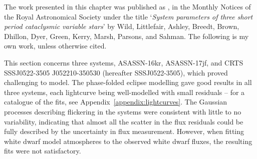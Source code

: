 \label{chpt:results:three peculiar white dwarfs} %


The work presented in this chapter was published as \cite{wild2021}, in the Monthly Notices of the Royal Astronomical Society under the title `\textit{System parameters of three short period cataclysmic variable stars}' by Wild, Littlefair, Ashley, Breedt, Brown, Dhillon, Dyer, Green, Kerry, Marsh, Parsons, and Sahman.
The following is my own work, unless otherwise cited.

This section concerns three systems, ASASSN-16kr, ASASSN-17jf, and CRTS SSSJ0522-3505 J052210-350530 (hereafter SSSJ0522-3505), which proved challenging to model.
The phase-folded eclipse modelling gave good results in all three systems, each lightcurve being well-modelled with small residuals -- for a catalogue of the fits, see Appendix~\ref{appendix:lightcurves}.
The Gaussian processes describing flickering in the systems were consistent with little to no variability, indicating that almost all the scatter in the flux residuals could be fully described by the uncertainty in flux measurement.
However, when fitting white dwarf model atmospheres to the observed white dwarf fluxes, the resulting fits were not satisfactory.


